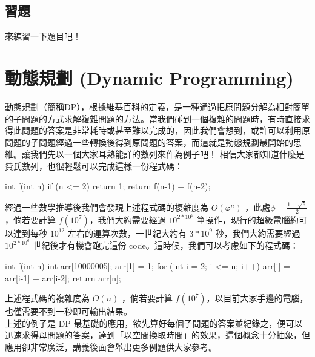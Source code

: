 	\subsection{習題}
		來練習一下題目吧！

\section{動態規劃 (Dynamic Programming)}
動態規劃（簡稱DP），根據維基百科的定義，是一種通過把原問題分解為相對簡單的子問題的方式求解複雜問題的方法。當我們碰到一個複雜的問題時，有時直接求得此問題的答案是非常耗時或甚至難以完成的，因此我們會想到，或許可以利用原問題的子問題經過一些轉換後得到原問題的答案，而這就是動態規劃最開始的思維。讓我們先以一個大家耳熟能詳的數列來作為例子吧！
相信大家都知道什麼是費氏數列，也很輕鬆可以完成這樣一份程式碼：
\begin{C++}
	int f(int n) {
		if (n <= 2) return 1;
		return f(n-1) + f(n-2);
	}
\end{C++}
經過一些數學推導後我們會發現上述程式碼的複雜度為 $O(\varphi^n)$ ，此處$\phi = \frac{1 + \sqrt{5}}{2}$，倘若要計算 $f(10^7)$，我們大約需要經過 $10^{2 * 10^6}$ 筆操作，現行的超級電腦約可以達到每秒 $10^12$ 左右的運算次數，一世紀大約有 $3 * 10^9$ 秒，我們大約需要經過 $10^{2 * 10^6}$ 世紀後才有機會跑完這份 code。這時候，我們可以考慮如下的程式碼：
\begin{C++}
	int f(int n) {
		int arr[10000005];
		arr[1] = 1;
		for (int i = 2; i <= n; i++) {
			arr[i] = arr[i-1] + arr[i-2];
		}
		return arr[n];
	}
\end{C++}
上述程式碼的複雜度為 $O(n)$ ，倘若要計算 $f(10^7)$，以目前大家手邊的電腦，也僅需要不到一秒即可輸出結果。\\
上述的例子是 DP 最基礎的應用，欲先算好每個子問題的答案並紀錄之，便可以迅速求得母問題的答案，達到「以空間換取時間」的效果，這個概念十分抽象，但應用卻非常廣泛，講義後面會舉出更多例題供大家參考。

